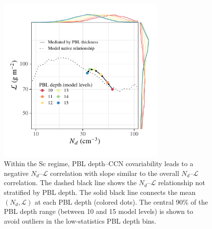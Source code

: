 \documentclass[acp, manuscript]{copernicus}\usepackage[]{graphicx}\usepackage[]{xcolor}
\newenvironment{knitrout}{}{} %
\newcommand\nd{\ensuremath{N_d}}
\newcommand\lwp{\ensuremath{\mathcal L}}
\begin{document}
\begin{figure}[t]
  \centering
\begin{knitrout}
\color{fgcolor}

{\centering \includegraphics[width=8.3cm]{figure/e3sm-pblh-plot-1} 

}


\end{knitrout}
  \caption{Within the Sc regime, PBL depth--CCN covariability leads to a
    negative \nd--\lwp{} correlation with slope similar to the overall
    \nd--\lwp{} correlation.  The dashed black line shows
    the \nd--\lwp{} relationship not stratified by PBL depth.  The solid black line connects
    the mean $(\nd,\lwp)$ at each PBL depth (colored dots).  The central 90\% of the PBL depth range (between 10 and 15 model levels) is shown to avoid outliers in the
    low-statistics PBL depth bins.}
  \label{fig:pblh}
\end{figure}
%
\clearpage
%
\end{document}
